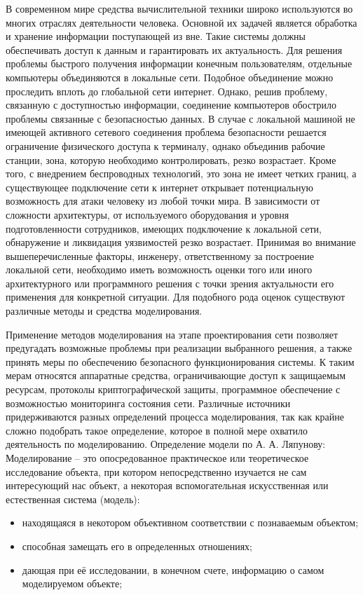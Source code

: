     В современном мире средства вычислительной техники широко используются во многих отраслях деятельности человека. Основной их задачей является обработка и хранение информации поступающей из вне. Такие системы должны обеспечивать доступ к данным и гарантировать их актуальность. Для решения проблемы быстрого получения информации конечным пользователям, отдельные компьютеры объединяются в локальные сети. Подобное объединение можно проследить вплоть до глобальной сети интернет. Однако, решив проблему, связанную с доступностью информации, соединение компьютеров обострило проблемы связанные с безопасностью данных. В случае с локальной машиной не имеющей активного сетевого соединения проблема безопасности решается ограничение физического доступа к терминалу, однако объединив рабочие станции, зона, которую необходимо контролировать, резко возрастает. Кроме того, с внедрением беспроводных технологий, это зона не имеет четких границ, а существующее подключение сети к интернет открывает потенциальную возможность для атаки человеку из любой точки мира. В зависимости от сложности архитектуры, от используемого оборудования и уровня подготовленности сотрудников, имеющих подключение к локальной сети, обнаружение и ликвидация уязвимостей резко возрастает. Принимая во внимание вышеперечисленные факторы, инженеру, ответственному за построение локальной сети, необходимо иметь возможность оценки того или иного архитектурного или программного решения с точки зрения актуальности его применения для конкретной ситуации. Для подобного рода оценок существуют различные методы и средства моделирования.
    
    Применение методов моделирования на этапе проектирования сети позволяет предугадать возможные проблемы при реализации выбранного решения, а также принять меры по обеспечению безопасного функционирования системы. К таким мерам относятся аппаратные средства, ограничивающие доступ к защищаемым ресурсам, протоколы криптографической защиты, программное обеспечение с возможностью мониторинга состояния сети. Различные источники придерживаются разных определений процесса моделирования, так как крайне сложно подобрать такое определение, которое в полной мере охватило деятельность по моделированию. Определение модели по А. А. Ляпунову: Моделирование – это опосредованное практическое или теоретическое исследование объекта, при котором непосредственно изучается не сам интересующий нас объект, а некоторая вспомогательная искусственная или естественная система (модель): 
    
    \begin{itemize}
        \item находящаяся в некотором объективном соответствии с познаваемым объектом;
        \item способная замещать его в определенных отношениях;
        \item дающая при её исследовании, в конечном счете, информацию о самом моделируемом объекте;
    \end{itemize}
    
